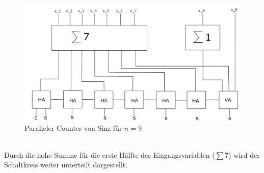 \documentclass[a4,abstract=on]{scrartcl}
\begin{document}
\begin{figure}[H]
\centering
\includegraphics[width=\textwidth]{Bsp_Sinz_grob.pdf}
\caption{Paralleler Counter von Sinz für $n=9$}
\label{fig:sinz_counter_para_bsp}
\end{figure}
\ \\
Durch die hohe Summe für die erste Hälfte der Eingangsvariablen ($\sum7$) wird der Schaltkreis weiter unterteilt dargestellt.
\end{document}
